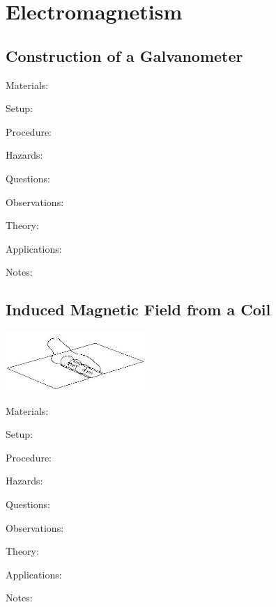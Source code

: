 \section{Electromagnetism}

\begin{multicols}{2}


\subsection{Construction of a Galvanometer} %


\begin{description*}
\item[Materials:]{}
\item[Setup:]{}
\item[Procedure:]{}
\item[Hazards:]{}
\item[Questions:]{}
\item[Observations:]{}
\item[Theory:]{}
\item[Applications:]{}
\item[Notes:]{}
\end{description*}

\subsection{Induced Magnetic Field from a Coil}

\begin{center}
\includegraphics[width=0.4\textwidth]{./img/induced-mag-field-coil.png}
\end{center}

\begin{description*}
\item[Materials:]{}
\item[Setup:]{}
\item[Procedure:]{}
\item[Hazards:]{}
\item[Questions:]{}
\item[Observations:]{}
\item[Theory:]{}
\item[Applications:]{}
\item[Notes:]{}
\end{description*}


\end{multicols}
